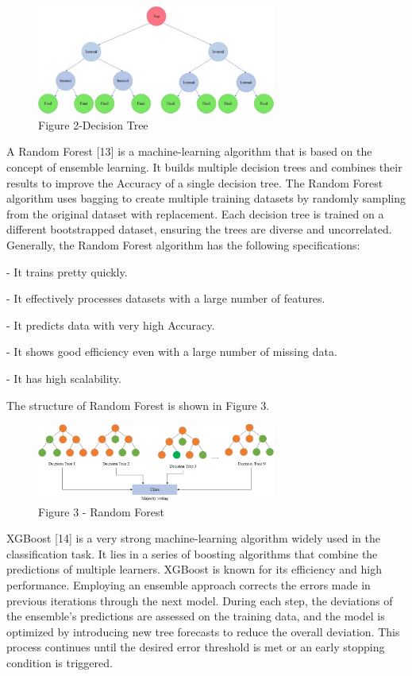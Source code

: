 \begin{figure}[H]
	\centering
	\includegraphics[width=0.7\textwidth]{media/ict/image39}
	\caption*{Figure 2-Decision Tree}
\end{figure}

\begin{multicols}{2}
A Random Forest {[}13{]} is a machine-learning algorithm that is based
on the concept of ensemble learning. It builds multiple decision trees
and combines their results to improve the Accuracy of a single decision
tree. The Random Forest algorithm uses bagging to create multiple
training datasets by randomly sampling from the original dataset with
replacement. Each decision tree is trained on a different bootstrapped
dataset, ensuring the trees are diverse and uncorrelated. Generally, the
Random Forest algorithm has the following specifications:

- It trains pretty quickly.

- It effectively processes datasets with a large number of features.

- It predicts data with very high Accuracy.

- It shows good efficiency even with a large number of missing data.

- It has high scalability.

The structure of Random Forest is shown in Figure 3.
\end{multicols}

\begin{figure}[H]
	\centering
	\includegraphics[width=0.7\textwidth]{media/ict/image40}
	\caption*{Figure 3 - Random Forest}
\end{figure}

XGBoost {[}14{]} is a very strong machine-learning algorithm widely used
in the classification task. It lies in a series of boosting algorithms
that combine the predictions of multiple learners. XGBoost is known for
its efficiency and high performance. Employing an ensemble approach
corrects the errors made in previous iterations through the next model.
During each step, the deviations of the ensemble's predictions are
assessed on the training data, and the model is optimized by introducing
new tree forecasts to reduce the overall deviation. This process
continues until the desired error threshold is met or an early stopping
condition is triggered.

